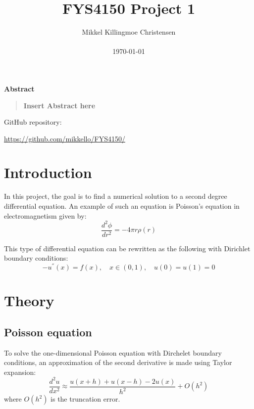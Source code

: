 \documentclass[12pt]{article}
\title{FYS4150 Project 1}
\author
{Mikkel Killingmoe Christensen\\
\\
\normalsize{\today}
}
\date{}
\newenvironment{sciabstract}{%
\begin{quote} \bf}
{\end{quote}}
\begin{document}
 


\baselineskip24pt


\maketitle 




\begin{center}
{\large \textbf{Abstract}}
\end{center}
\begin{sciabstract}
Insert  Abstract here
\end{sciabstract}

\par GitHub repository:
\par \url{https://github.com/mikkello/FYS4150/}

\section{Introduction}
In this project, the goal is to find a numerical solution to a second degree differential equation. An example of such an equation is Poisson's equation in electromagnetism given by:
\begin{equation}
\frac{d^{2} \phi}{dr^{2}}=-4 \pi r\rho (r)
\end{equation}

This type of differential equation can be rewritten as the following with Dirichlet boundary conditions:
\begin{equation}
-u^{''}(x)=f(x), \quad x\in(0,1), \quad u(0)=u(1)=0
\end{equation}



\section{Theory}
\subsection{Poisson equation}
To solve the one-dimensional Poisson equation with Dirchelet boundary conditions, an approximation of the second derivative is made using Taylor expansion:
\begin{equation}
\frac{d^{2}u}{dx^{2}}\approx\frac{u(x+h)+u(x-h)-2u(x)}{h^{2}}+O(h^{2})
\end{equation}
where $O(h^{2})$ is the truncation error. 
\end{document}
